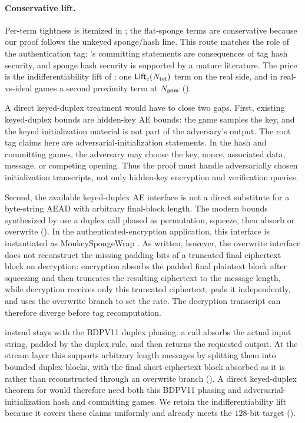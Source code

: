 \paragraph{Conservative lift.}
Per-term tightness is itemized in ; the flat-sponge terms
are conservative because our proof follows the unkeyed sponge/hash line. This
route matches the role of the authentication tag: \TW{}'s committing statements
are consequences of tag hash security, and sponge hash security is supported by
a mature literature. The price is the indifferentiability lift of
: one $\mathsf{Lift}_c(N_{\mathsf{tot}})$ term on the real side, and in
real-vs-ideal games a second proximity term at $N_{\mathsf{prim}}$
().

A direct keyed-duplex treatment would have to close two gaps. First, existing
keyed-duplex bounds are hidden-key AE bounds: the game samples the key, and the
keyed initialization material is not part of the adversary's output. The
root tag claims here are adversarial-initialization statements. In the hash and
committing games, the adversary may choose the key, nonce, associated data,
message, or competing opening. Thus the proof must handle adversarially chosen
initialization transcripts, not only hidden-key encryption and verification
queries.

Second, the available keyed-duplex AE interface is not a direct substitute for a
byte-string AEAD with arbitrary final-block length. The modern bounds
synthesized by \cite{Men23} use a duplex call phased as permutation, squeeze,
then absorb or overwrite (\cite[Sec.~3.4, Table~1]{Men23}). In the
authenticated-encryption application, this interface is instantiated as
\textsf{MonkeySpongeWrap} \cite[Alg.~8]{Men23}. As written, however, the
overwrite interface does not reconstruct the missing padding bits of a truncated
final ciphertext block on decryption: encryption absorbs the padded final
plaintext block after squeezing and then truncates the resulting ciphertext to
the message length, while decryption receives only this truncated ciphertext,
pads it independently, and uses the overwrite branch to set the rate. The
decryption transcript can therefore diverge before tag recomputation.

\TW{} instead stays with the BDPV11 duplex phasing: a call absorbs the actual
input string, padded by the duplex rule, and then returns the requested output.
At the stream layer this supports arbitrary length messages by splitting them
into bounded duplex blocks, with the final short ciphertext block absorbed as it
is rather than reconstructed through an overwrite branch (). A
direct keyed-duplex theorem for \TW{} would therefore need both this BDPV11
phasing and adversarial-initialization hash and committing games. We retain the
indifferentiability lift because it covers these claims uniformly and already
meets the $128$-bit target
().

